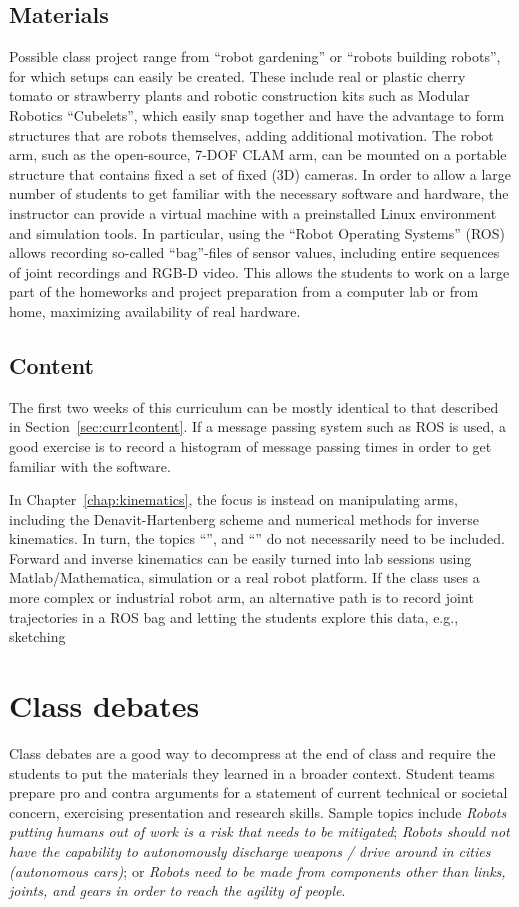 \documentclass[paper=6.14in:9.21in,pagesize=pdftex,11pt,twoside,openright]{scrbook}
\begin{document}
\subsection{Materials}
Possible class project range from ``robot gardening'' or ``robots building robots'', for which setups can easily be created. These include real or plastic cherry tomato or strawberry plants and robotic construction kits such as Modular Robotics ``Cubelets'', which easily snap together and have the advantage to form structures that are robots themselves, adding additional motivation. The robot arm, such as the open-source, 7-DOF CLAM arm, can be mounted on a portable structure that contains fixed a set of fixed (3D) cameras. In order to allow a large number of students to get familiar with the necessary software and hardware, the instructor can provide a virtual machine with a preinstalled Linux environment and simulation tools. In particular, using the ``Robot Operating Systems'' (ROS) allows recording so-called ``bag''-files of sensor values, including entire sequences of joint recordings and RGB-D video. This allows the students to work on a large part of the homeworks and project preparation from a computer lab or from home, maximizing availability of real hardware.

\subsection{Content}
The first two weeks of this curriculum can be mostly identical to that described in Section~\ref{sec:curr1content}. If a message passing system such as ROS is used, a good exercise is to record a histogram of message passing times in order to get familiar with the software.

In Chapter~\ref{chap:kinematics}, the focus is instead on manipulating arms, including the Denavit-Hartenberg scheme and numerical methods for inverse kinematics. In turn, the topics ``'', and ``'' do not necessarily need to be included. Forward and inverse kinematics can be easily turned into lab sessions using Matlab/Mathematica, simulation or a real robot platform. If the class uses a more complex or industrial robot arm, an alternative path is to record joint trajectories in a ROS bag and letting the students explore this data, e.g., sketching


\section{Class debates}\label{sec:debates}
Class debates are a good way to decompress at the end of class and require the students to put the materials they learned in a broader context. Student teams prepare pro and contra arguments for a statement of current technical or societal concern, exercising presentation and research skills. Sample topics include \emph{Robots putting humans out of work is a risk that needs to be mitigated}; \emph{Robots should not have the capability to autonomously discharge weapons / drive around in cities (autonomous cars)}; or \emph{Robots need to be made from components other than links, joints, and gears in order to reach the agility of people}.
\end{document}
